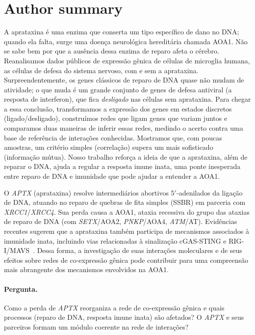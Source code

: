 \documentclass[10pt,letterpaper]{article}
\newcommand{\gene}[1]{\textit{#1}}
\begin{document}
\section*{Author summary}
A aprataxina é uma enzima que conserta um tipo específico de dano no DNA; quando
ela falta, surge uma doença neurológica hereditária chamada AOA1. Não se sabe
bem por que a ausência dessa enzima de reparo afeta o cérebro. Reanalisamos dados
públicos de expressão gênica de células de microglia humana, as células de
defesa do sistema nervoso, com e sem a aprataxina. Surpreendentemente, os
genes clássicos de reparo de DNA quase não mudam de atividade; o que muda é um
grande conjunto de genes de defesa antiviral (a resposta de interferon), que fica
\emph{desligado} nas células sem aprataxina. Para chegar a essa conclusão, transformamos a expressão dos genes em
estados discretos (ligado/desligado), construímos redes que ligam genes que
variam juntos e comparamos duas maneiras de inferir essas redes, medindo o acerto
contra uma base de referência de interações conhecidas. Mostramos que, com poucas
amostras, um critério simples (correlação) supera um mais sofisticado
(informação mútua). Nosso trabalho reforça a ideia de que a aprataxina, além de
reparar o DNA, ajuda a regular a resposta imune inata, uma ponte inesperada
entre reparo de DNA e imunidade que pode ajudar a entender a AOA1.

\linenumbers


O \gene{APTX} (aprataxina) resolve intermediários abortivos 5\('\)-adenilados da
ligação de DNA, atuando no reparo de quebras de fita simples (SSBR) em parceria
com \gene{XRCC1}/\gene{XRCC4}. Sua perda causa a AOA1, ataxia recessiva do grupo
das ataxias de reparo de DNA (com \gene{SETX}/AOA2, \gene{PNKP}/AOA4,
\gene{ATM}/AT). Evidências recentes sugerem que a aprataxina também participa de
mecanismos associados à imunidade inata, incluindo vias relacionadas à
sinalização cGAS-STING e RIG-I/MAVS~\cite{Madsen2023}. Dessa forma, a
investigação de suas interações moleculares e de seus efeitos sobre redes de
co-expressão gênica pode contribuir para uma compreensão mais abrangente dos
mecanismos envolvidos na AOA1.

\paragraph{Pergunta.} Como a perda de \gene{APTX} reorganiza a rede de
co-expressão gênica e quais processos (reparo de DNA, resposta imune inata) são
afetados? O \gene{APTX} e seus parceiros formam um módulo coerente na rede de
interações?
\end{document}
